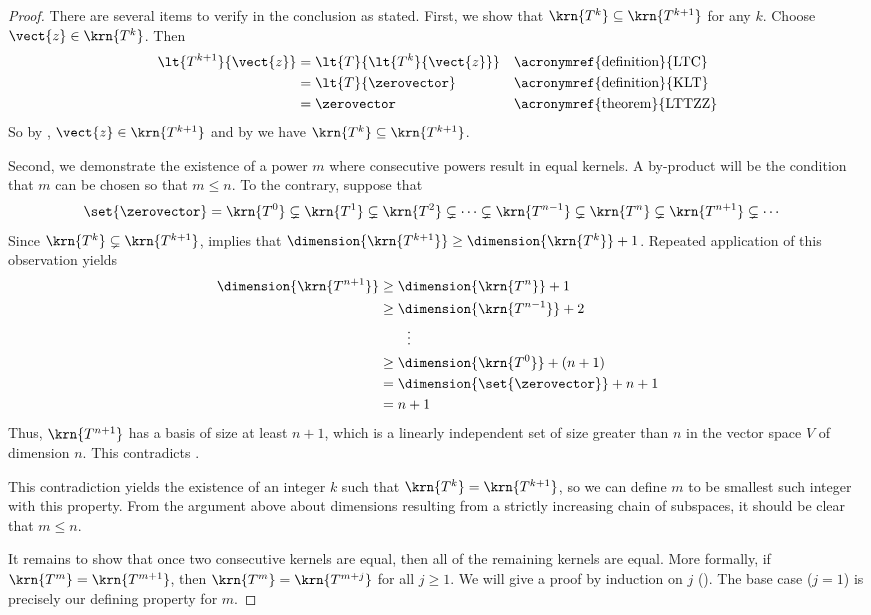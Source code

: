 %
\begin{proof}
There are several items to verify in the conclusion as stated.  First, we show that $\krn{T^k}\subseteq\krn{T^{k+1}}$ for any $k$.    Choose $\vect{z}\in\krn{T^k}$.  Then
%
\begin{align*}
\lt{T^{k+1}}{\vect{z}}
&=\lt{T}{\lt{T^k}{\vect{z}}}&&\text{\acronymref{definition}{LTC}}\\
&=\lt{T}{\zerovector}&&\text{\acronymref{definition}{KLT}}\\
&=\zerovector&&\text{\acronymref{theorem}{LTTZZ}}
\end{align*}
%
So by , $\vect{z}\in\krn{T^{k+1}}$ and by  we have $\krn{T^k}\subseteq\krn{T^{k+1}}$.\par
%
Second, we demonstrate the existence of a power $m$ where consecutive powers result in equal kernels.  A by-product will be the condition that $m$ can be chosen so that $m\leq n$.  To the contrary, suppose that
%
\begin{align*}
\set{\zerovector}
&=\krn{T^0}
\subsetneq\krn{T^1}
\subsetneq\krn{T^2}
\subsetneq\cdots
\subsetneq\krn{T^{n-1}}
\subsetneq\krn{T^n}
\subsetneq\krn{T^{n+1}}
\subsetneq\cdots
\end{align*}
%
Since $\krn{T^k}\subsetneq\krn{T^{k+1}}$,  implies that $\dimension{\krn{T^{k+1}}}\geq\dimension{\krn{T^k}}+1$.  Repeated application of this observation yields
%
\begin{align*}
\dimension{\krn{T^{n+1}}}
&\geq\dimension{\krn{T^n}}+1\\
&\geq\dimension{\krn{T^{n-1}}}+2\\
&\quad\quad\vdots\\
&\geq\dimension{\krn{T^{0}}}+(n+1)\\
&=\dimension{\set{\zerovector}}+n+1\\
&=n+1
\end{align*}
%
Thus, $\krn{T^{n+1}}$ has a basis of size at least $n+1$, which is a linearly independent set of size greater than $n$ in the vector space $V$ of dimension $n$.  This contradicts .\par
%
This contradiction yields the existence of an integer $k$ such that $\krn{T^k}=\krn{T^{k+1}}$, so we can define $m$ to be smallest such integer with this property.  From the argument above about dimensions resulting from a strictly increasing chain of subspaces, it should be clear that $m\leq n$.\par
%
It remains to show that once two consecutive kernels are equal, then all of the remaining kernels are equal.  More formally, if $\krn{T^m}=\krn{T^{m+1}}$, then $\krn{T^m}=\krn{T^{m+j}}$ for all $j\geq 1$.  We will give a proof by induction on $j$ ().  The base case ($j=1$) is precisely our defining property for $m$.\par

\end{proof}
